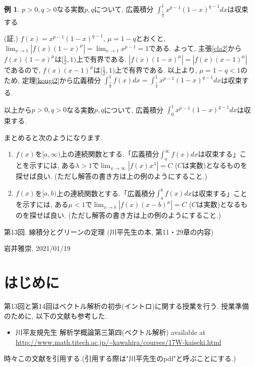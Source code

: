 \documentclass[dvipdfmx,a4paper,11pt]{article}
\theoremstyle{definition}
\newtheorem{exa}[thm]{例}
\begin{document}
 \begin{exa}
$p>0, q>0$なる実数$p,q$について, 広義積分
$\int_{\frac{1}{2}}^{1}x^{p-1}(1-x)^{q-1} dx$は収束する

\hspace{-18pt}(証.)
$f(x) = x^{p-1}(1-x)^{q-1}$, $\mu = 1-q$とおくと, $\lim_{x \rightarrow 1} |f(x) (1-x)^{\mu}| =\lim_{x \rightarrow 1} x^{p-1}=1$である.
よって, 主張\ref{cla2}から$f(x)(1-x)^{\mu}$は$[\frac{1}{2},1)$上で有界である.
$|f(x)(1-x)^{\mu}| = |f(x)(x-1)^{\mu}|$であるので, $f(x)(x-1)^{\mu}$は$[\frac{1}{2},1)$上で有界である.
以上より, $\mu=1-q<1$のため, 定理\ref{kougi2}から広義積分
$\int_{\frac{1}{2}}^{1} f(x) dx = \int_{\frac{1}{2}}^{1}x^{p-1}(1-x)^{q-1} dx$は収束する.

 \end{exa}
 以上から$p>0, q>0$なる実数$p,q$について, 広義積分
$\int^{1}_{0}x^{p-1}(1-x)^{q-1} dx$は収束する.

\vspace{11pt}
まとめると次のようになります.
 \begin{tcolorbox}[
    colback = white,
    colframe = green!35!black,
    fonttitle = \bfseries,
    breakable = true]

\begin{enumerate}
\item $f(x)$を$[a,\infty)$上の連続関数とする.「広義積分$\int_{a}^{\infty} f(x)dx $は収束する」ことを示すには, ある$\lambda >1$で$\lim_{x \rightarrow \infty} |f(x) x^{\lambda}|=C$
($C$は実数)となるものを探せば良い. (ただし解答の書き方は上の例のようにすること.)
\item $f(x)$を$[a,b)$上の連続関数とする.「広義積分$\int_{a}^{b} f(x)dx $は収束する」ことを示すには, ある$\mu <1$で$\lim_{x \rightarrow b} |f(x) (x-b)^{\mu}|=C$
($C$は実数)となるものを探せば良い. (ただし解答の書き方は上の例のようにすること.)
\end{enumerate}
 \end{tcolorbox}

\newpage

\begin{center}
{\Large 第13回. 線積分とグリーンの定理  (川平先生の本, 第11・29章の内容)}
\end{center}

\begin{flushright}
 岩井雅崇, 2021/01/19
\end{flushright}


\section{はじめに}
第13回と第14回はベクトル解析の初歩(イントロ)に関する授業を行う.
授業準備のために, 以下の文献も参考した.
\begin{itemize}
\item 川平友規先生 解析学概論第三第四(ベクトル解析) available at \url{http://www.math.titech.ac.jp/~kawahira/courses/17W-kaiseki.html}
\end{itemize}
時々この文献を引用する.(引用する際は"川平先生のpdf"と呼ぶことにする.)
\end{document}
